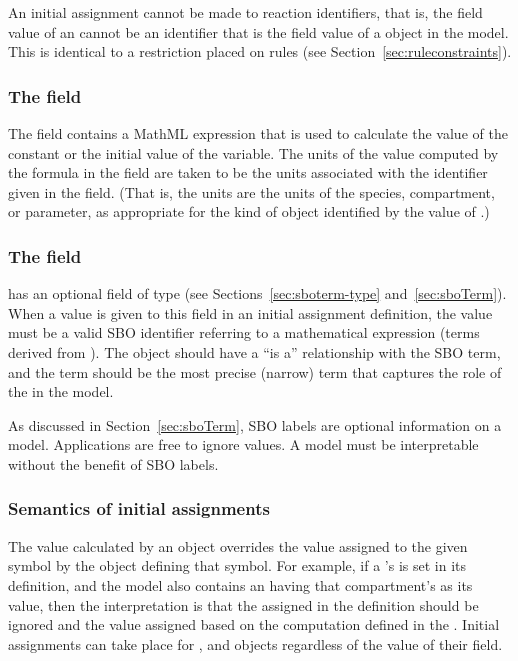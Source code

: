An initial assignment cannot be made to reaction identifiers, that
is, the  field value of an \InitialAssignment cannot
be an identifier that is the  field value of a \Reaction
object in the model.  This is identical to a restriction placed on
rules (see Section~\ref{sec:ruleconstraints}).


\subsubsection{The  field}

The  field contains a MathML expression that is used
to calculate the value of the constant or the initial value of the
variable.  The units of the value computed by the formula in the
 field are taken to be the units associated with the
identifier given in the  field.  (That is, the units
are the units of the species, compartment, or parameter, as
appropriate for the kind of object identified by the value of
.)


\subsubsection{The  field}
\label{sec:initialassignment-sboterm}

\InitialAssignment has an optional  field of type
 (see Sections~\ref{sec:sboterm-type}
and~\ref{sec:sboTerm}).  When a value is given to this field in an
initial assignment definition, the value must be a valid SBO
identifier referring to a mathematical expression (\ie terms
derived from \sbomathformula).  The \InitialAssignment object
should have a ``is a'' relationship with the SBO term, and the
term should be the most precise (narrow) term that captures the
role of the \InitialAssignment in the model.

As discussed in Section~\ref{sec:sboTerm}, SBO labels are optional
information on a model.  Applications are free to ignore
 values.  A model must be interpretable without the
benefit of SBO labels.


\subsubsection{Semantics of initial assignments}
\label{sec:initial-assignment-semantics}

The value calculated by an \InitialAssignment object overrides the
value assigned to the given symbol by the object defining that
symbol.  For example, if a \Compartment's  is set in
its definition, and the model also contains an \InitialAssignment
having that compartment's  as its  value,
then the interpretation is that the  assigned in the
\Compartment definition should be ignored and the value assigned
based on the computation defined in the \InitialAssignment.
Initial assignments can take place for \Compartment, \Species and
\Parameter objects regardless of the value of their
 field.

